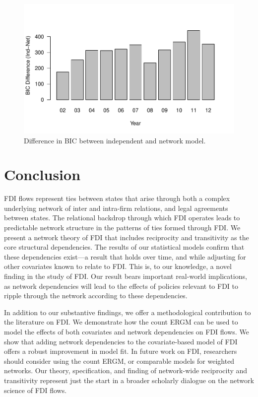 \documentclass[12pt]{article}
\begin{document}
\begin{figure}[htp]
\centering
\includegraphics[scale=.75]{draft_figures/BICdiff.pdf} \vspace{-.5cm}
\caption{\label{fig:bic} Difference in BIC between independent and network model.}
\end{figure}


\section{Conclusion}

FDI flows represent ties between states that arise through both a complex underlying network of inter and intra-firm relations, and legal agreements between states. The relational backdrop through which FDI operates leads to predictable network structure in the patterns of ties formed through FDI. We present a network theory of FDI that includes reciprocity and transitivity as the core structural dependencies. The results of our statistical models confirm that these dependencies exist---a result that holds over time, and while adjusting for other covariates known to relate to FDI. This is, to our knowledge, a novel finding in the study of FDI. Our result bears important real-world implications, as network dependencies will lead to the effects of policies relevant to FDI to ripple through the network according to these dependencies.

In addition to our substantive findings, we offer a methodological contribution to the literature on FDI. We demonstrate how the count ERGM can be used to model the effects of both covariates and network dependencies on FDI flows. We show that adding network dependencies to the covariate-based model of FDI offers a robust improvement in model fit. In future work on FDI, researchers should consider using the count ERGM, or comparable models for weighted networks. Our theory, specification, and finding of network-wide reciprocity and transitivity represent just the start in a broader scholarly dialogue on the network science of FDI flows.


\newpage
\singlespacing


\end{document}
